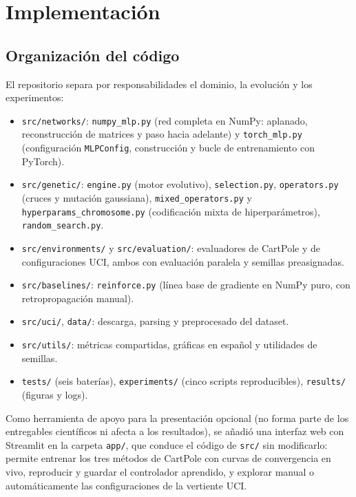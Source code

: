 \section{Implementación}
\label{sec:implementacion}

\subsection{Organización del código}

El repositorio separa por responsabilidades el dominio, la evolución y los experimentos:

{\small
\begin{itemize}
  \item \texttt{src/networks/}: \texttt{numpy\_mlp.py} (red completa en NumPy: aplanado, reconstrucción de matrices y paso hacia adelante) y \texttt{torch\_mlp.py} (configuración \texttt{MLPConfig}, construcción y bucle de entrenamiento con PyTorch).
  \item \texttt{src/genetic/}: \texttt{engine.py} (motor evolutivo), \texttt{selection.py}, \texttt{operators.py} (cruces y mutación gaussiana), \texttt{mixed\_operators.py} y \texttt{hyperparams\_chromosome.py} (codificación mixta de hiperparámetros), \texttt{random\_search.py}.
  \item \texttt{src/environments/} y \texttt{src/evaluation/}: evaluadores de CartPole y de configuraciones UCI, ambos con evaluación paralela y semillas preasignadas.
  \item \texttt{src/baselines/}: \texttt{reinforce.py} (línea base de gradiente en NumPy puro, con retropropagación manual).
  \item \texttt{src/uci/}, \texttt{data/}: descarga, parsing y preprocesado del dataset.
  \item \texttt{src/utils/}: métricas compartidas, gráficas en español y utilidades de semillas.
  \item \texttt{tests/} (seis baterías), \texttt{experiments/} (cinco scripts reproducibles), \texttt{results/} (figuras y logs).
\end{itemize}
}

Como herramienta de apoyo para la presentación opcional (no forma parte de los entregables científicos ni afecta a los resultados), se añadió una interfaz web con Streamlit en la carpeta \texttt{app/}, que conduce el código de \texttt{src/} sin modificarlo: permite entrenar los tres métodos de CartPole con curvas de convergencia en vivo, reproducir y guardar el controlador aprendido, y explorar manual o automáticamente las configuraciones de la vertiente UCI.

